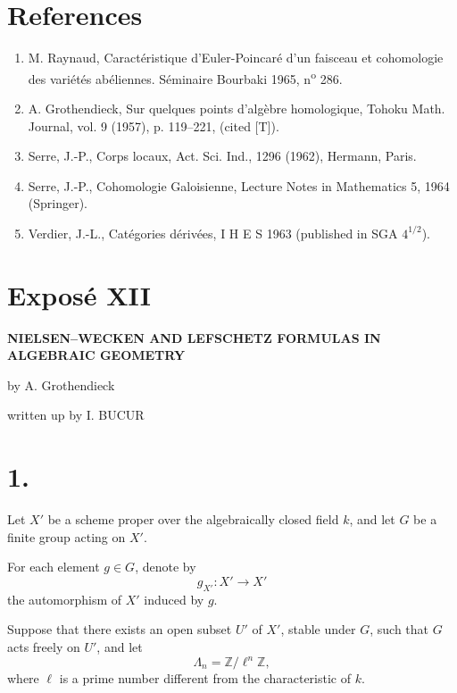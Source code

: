 \documentclass[11pt]{article}
\providecommand{\La}{\Lambda}
\providecommand{\bZ}{\mathbb Z}
\begin{document}
\section*{References}

\begin{enumerate}
\item[{[1]}] M. Raynaud, Caractéristique d'Euler-Poincaré d'un faisceau et cohomologie des variétés abéliennes. Séminaire Bourbaki 1965, n\textsuperscript{o} 286.
\item[{[2]}] A. Grothendieck, Sur quelques points d'algèbre homologique, Tohoku Math. Journal, vol. 9 (1957), p. 119--221, (cited [T]).
\item[{[3]}] Serre, J.-P., Corps locaux, Act. Sci. Ind., 1296 (1962), Hermann, Paris.
\item[{[4]}] Serre, J.-P., Cohomologie Galoisienne, Lecture Notes in Mathematics 5, 1964 (Springer).
\item[{[5]}] Verdier, J.-L., Catégories dérivées, I H E S 1963 (published in SGA $4^{1/2}$).
\end{enumerate}


\label{sga5:XII:expose:xii}\section*{Exposé XII}

\begin{center}
\Large\bfseries NIELSEN--WECKEN AND LEFSCHETZ FORMULAS IN ALGEBRAIC GEOMETRY
\end{center}

\begin{center}
by A. Grothendieck

written up by I. BUCUR
\end{center}

\bigskip

\section*{1.}\label{sga5:XII:section:1}
Let $X'$ be a scheme proper over the algebraically closed field $k$, and let $G$ be a finite group acting on $X'$.

For each element $g\in G$, denote by
\[
g_{X'}:X'\to X'
\]
the automorphism of $X'$ induced by $g$.

Suppose that there exists an open subset $U'$ of $X'$, stable under $G$, such that $G$ acts freely on $U'$, and let
\[
\La_n=\bZ/\ell^n\bZ,
\]
where $\ell$ is a prime number different from the characteristic of $k$.
\end{document}
